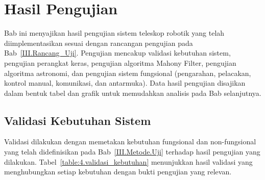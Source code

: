 \section{Hasil Pengujian} \label{IV.HasilPengujian}

Bab ini menyajikan hasil pengujian sistem teleskop robotik yang telah diimplementasikan sesuai dengan rancangan pengujian pada Bab~\ref{III.Rancang_Uji}. Pengujian mencakup validasi kebutuhan sistem, pengujian perangkat keras, pengujian algoritma Mahony Filter, pengujian algoritma astronomi, dan pengujian sistem fungsional (pengarahan, pelacakan, kontrol manual, komunikasi, dan antarmuka). Data hasil pengujian disajikan dalam bentuk tabel dan grafik untuk memudahkan analisis pada Bab selanjutnya.

\subsection{Validasi Kebutuhan Sistem} \label{IV.Validasi36}
Validasi dilakukan dengan memetakan kebutuhan fungsional dan non-fungsional yang telah didefinisikan pada Bab~\ref{III.Metode.Uji} terhadap hasil pengujian yang dilakukan. Tabel~\ref{table:4.validasi_kebutuhan} menunjukkan hasil validasi yang menghubungkan setiap kebutuhan dengan bukti pengujian yang relevan. \par


